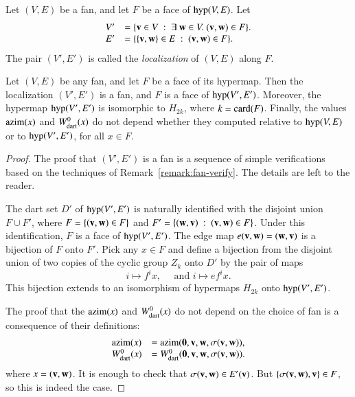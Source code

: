 \begin{definition}[localization]  Let $(V,E)$ be a fan, and let $F$ be a face of ${\operatorname{hyp}}(V,E)$.  
Let 
$$
\begin{array}{rll}
V' &= \{{\mathbf v}\in V \ :\  \exists~{\mathbf w}\in V.~({\mathbf v},{\mathbf w})\in F\}.\\
E' &= \{\{{\mathbf v},{\mathbf w}\} \in E\ :\  ({\mathbf v},{\mathbf w})\in F\}.
\end{array}
$$
The pair $(V',E')$ is called the {\it localization} of $(V,E)$ along $F$.
\end{definition}
%


\begin{lemma}[localization]\label{lemma:localization}  
Let $(V,E)$ be any fan, and let $F$ be a face of its hypermap.  
Then the localization $(V',E')$ is a fan, and $F$ is a face of ${\operatorname{hyp}}(V',E')$.  Moreover, the hypermap ${\operatorname{hyp}}(V',E')$ is isomorphic
to $H_{2k}$, where $k= {\operatorname{card}}(F)$.
 Finally, the values ${\operatorname{azim}}(x)$ and $W^0_{\text{dart}}(x)$  do not depend
whether they computed relative to ${\operatorname{hyp}}(V,E)$ or to ${\operatorname{hyp}}(V',E')$, for all $x\in F$.
\end{lemma}



\begin{proof}
The proof that  $(V',E')$ is a fan is a sequence of simple verifications based on
the techniques of Remark~\ref{remark:fan-verify}.  The details are left to the reader.

The dart set $D'$ of ${\operatorname{hyp}}(V',E')$ is naturally identified with the disjoint union $F\cup F'$, where
$F = \{({\mathbf v},{\mathbf w}) \in F\}$ and $F'=\{({\mathbf w},{\mathbf v}) \ :\  ({\mathbf v},{\mathbf w})\in F\}$.  Under this identification, $F$ is a face of ${\operatorname{hyp}}(V',E')$.  The edge map $e({\mathbf v},{\mathbf w})= ({\mathbf w},{\mathbf v})$ is a bijection of $F$ onto $F'$.   Pick any $x\in F$ and
define a bijection from the disjoint union of two copies of the cyclic group $Z_k$ onto $D'$  by 
the pair of maps
$$
i \mapsto f^i x,\quad\text{ and } i\mapsto e f^i x.
$$
This bijection extends to an isomorphism of hypermaps $H_{2k}$ onto ${\operatorname{hyp}}(V',E')$.

The proof that the ${\operatorname{azim}}(x)$ and $W^0_{\text{dart}}(x)$ do not depend on the choice of fan is a consequence of their definitions:
$$
\begin{array}{lll}
{\operatorname{azim}}(x) &= {\operatorname{azim}}({\mathbf 0},{\mathbf v},{\mathbf w},\sigma({\mathbf v},{\mathbf w})),\\
W^0_{\text{dart}}(x) &= W^0_{\text{dart}}({\mathbf 0},{\mathbf v},{\mathbf w},\sigma({\mathbf v},{\mathbf w})).\\
\end{array}
$$
where $x = ({\mathbf v},{\mathbf w})$.    It is enough to check that $\sigma({\mathbf v},{\mathbf w})\in E'({\mathbf v})$. 
But $\{\sigma({\mathbf v},{\mathbf w}),{\mathbf v}\}\in F$, so this is indeed the case.
\end{proof}



